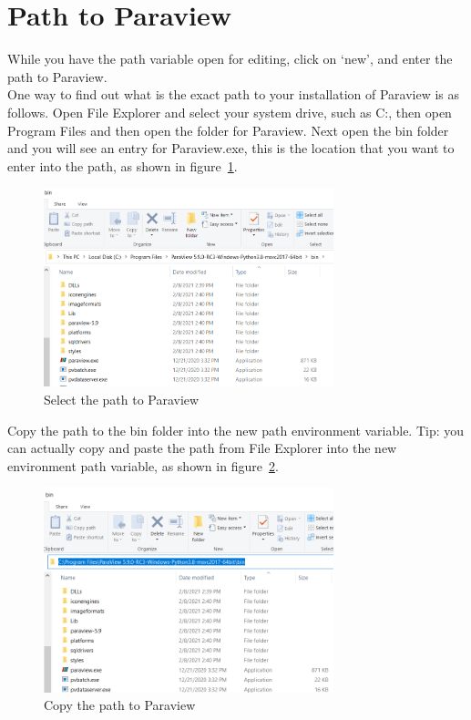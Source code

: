 \section{Path to Paraview}

While you have the path variable open for editing, click on `new', and enter the path to Paraview.\\

One way to find out what is the exact path to your installation of Paraview is as follows.  Open File Explorer and select your system drive, such as C:, then open Program Files and then open the folder for Paraview.  Next open the bin folder and you will see an entry for Paraview.exe, this is the location that you want to enter into the path, as shown in figure~\ref{fg:path-3}.

\begin{figure}[H]
\begin{center}
\includegraphics[width=0.75\textwidth]{path-3}
\caption{Select the path to Paraview}\label{fg:path-3}
\end{center}
\end{figure}

Copy the path to the bin folder into the new path environment variable.  Tip: you can actually copy and paste the path from File Explorer into the new environment path variable, as shown in figure~\ref{fg:path-4}.\\

\begin{figure}[H]
\begin{center}
\includegraphics[width=0.75\textwidth]{path-4}
\caption{Copy the path to Paraview}\label{fg:path-4}
\end{center}
\end{figure}

